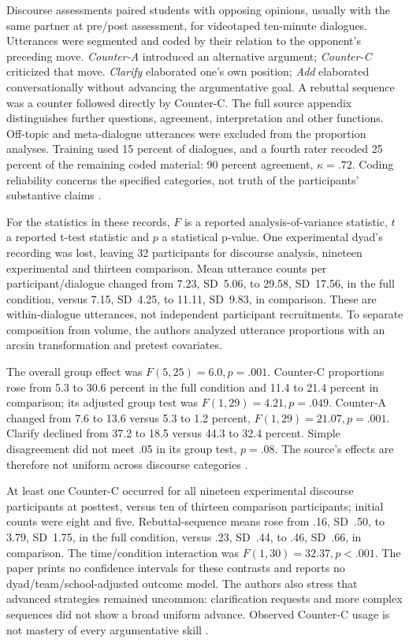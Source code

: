 Discourse assessments paired students with opposing opinions, usually with
the same partner at pre/post assessment, for videotaped ten-minute dialogues.
Utterances were segmented and coded by their relation to the opponent's
preceding move. \emph{Counter-A} introduced an alternative argument;
\emph{Counter-C} criticized that move. \emph{Clarify} elaborated one's
own position; \emph{Add} elaborated conversationally without advancing
the argumentative goal. A rebuttal sequence was a counter followed directly
by Counter-C. The full source appendix distinguishes further questions,
agreement, interpretation and other functions. Off-topic and meta-dialogue
utterances were excluded from the proportion analyses. Training used
15 percent of dialogues, and a fourth rater recoded 25 percent of the
remaining coded material: 90 percent agreement, \(\kappa=.72\).
Coding reliability concerns the specified categories, not truth of the
participants' substantive claims
\cite[pp.~1248--1249,1252--1253,1259--1260]{KuhnUdell2003Development}.

For the statistics in these records, \(F\) is a reported analysis-of-variance
statistic, \(t\) a reported t-test statistic and \(p\) a statistical p-value.
One experimental dyad's recording was lost, leaving 32 participants for
discourse analysis, nineteen experimental and thirteen comparison. Mean
utterance counts per participant/dialogue changed from 7.23, SD~5.06,
to 29.58, SD~17.56, in the full condition, versus 7.15, SD~4.25,
to 11.11, SD~9.83, in comparison. These are within-dialogue utterances,
not independent participant recruitments. To separate composition from
volume, the authors analyzed utterance proportions with an arcsin
transformation and pretest covariates.

The overall group effect was \(F(5,25)=6.0,p=.001\). Counter-C
proportions rose from 5.3 to 30.6 percent in the full condition and
11.4 to 21.4 percent in comparison; its adjusted group test was
\(F(1,29)=4.21,p=.049\). Counter-A changed from 7.6 to 13.6
versus 5.3 to 1.2 percent, \(F(1,29)=21.07,p=.001\).
Clarify declined from 37.2 to 18.5 versus 44.3 to 32.4 percent.
Simple disagreement did not meet .05 in its group test, \(p=.08\).
The source's effects are therefore not uniform across discourse categories
\cite[p.~1252, tables~3--4]{KuhnUdell2003Development}.

At least one Counter-C occurred for all nineteen experimental discourse
participants at posttest, versus ten of thirteen comparison participants;
initial counts were eight and five. Rebuttal-sequence means rose from .16,
SD~.50, to 3.79, SD~1.75, in the full condition, versus .23,
SD~.44, to .46, SD~.66, in comparison. The time/condition interaction
was \(F(1,30)=32.37,p<.001\). The paper prints no confidence intervals
for these contrasts and reports no dyad/team/school-adjusted outcome model.
The authors also stress that advanced strategies remained uncommon:
clarification requests and more complex sequences did not show a broad
uniform advance. Observed Counter-C usage is not mastery of every
argumentative skill
\cite[pp.~1253,1256--1257, table~6]{KuhnUdell2003Development}.

